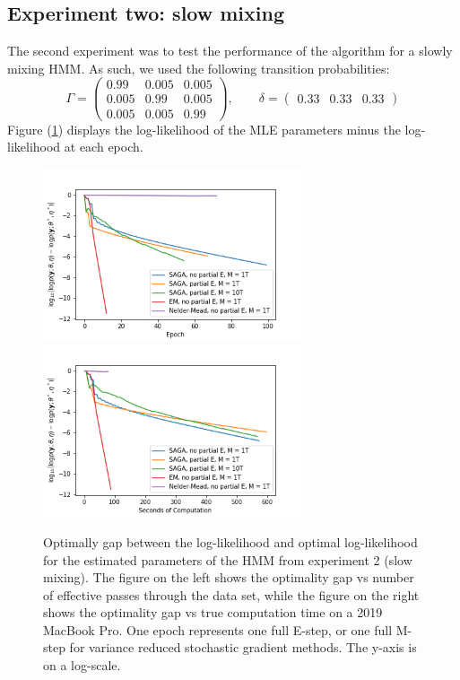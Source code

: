 \subsection{Experiment two: slow mixing}

The second experiment was to test the performance of the algorithm for a slowly mixing HMM. As such, we used the following transition probabilities:
%
\begin{equation*}
    \Gamma = 
    \begin{pmatrix} 
        0.99 & 0.005 & 0.005 \\
        0.005 & 0.99 & 0.005 \\
        0.005 & 0.005 & 0.99
    \end{pmatrix},
    \qquad
    \delta = \begin{pmatrix} 0.33 & 0.33 & 0.33 \end{pmatrix}
\end{equation*}
%
Figure (\ref{fig:exp2_ll}) displays the log-likelihood of the MLE parameters minus the log-likelihood at each epoch.
%
\begin{figure}
    \centering
    \includegraphics[width=3in]{../plt/log-like_v_epoch_exp_2.png}
    \includegraphics[width=3in]{../plt/log-like_v_time_exp_2.png}
    \caption{Optimally gap between the log-likelihood and optimal log-likelihood for the estimated parameters of the HMM from experiment 2 (slow mixing). The figure on the left shows the optimality gap vs number of effective passes through the data set, while the figure on the right shows the optimality gap vs true computation time on a 2019 MacBook Pro. One epoch represents one full E-step, or one full M-step for variance reduced stochastic gradient methods. The y-axis is on a log-scale.}
    \label{fig:exp2_ll}
\end{figure}